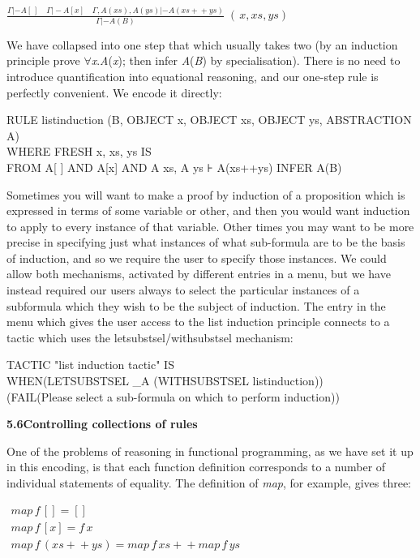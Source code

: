 $\frac{\Gamma  |- A[\,]\quad \Gamma  |- A[x]\quad \Gamma,A\left( xs\right),A\left( ys\right)  |- A\left( xs{}+{}+{}ys\right) }{\Gamma  |- A\left( B\right) } \;(\,x,xs,ys)$

We have collapsed into one step that which usually takes two (by an induction principle prove \ensuremath{\forall}\textit{x}.\textit{A}(\textit{x}); then infer \textit{A}(\textit{B}) by specialisation). There is no need to introduce quantification into equational reasoning, and our one-step rule is perfectly convenient. We encode it directly:

RULE listinduction (B, OBJECT x, OBJECT xs, OBJECT ys, ABSTRACTION A) \\
\tab WHERE FRESH x, xs, ys IS\\
\tab \tab FROM A[ ] AND A[x] AND A xs, A ys ⊦ A(xs++ys) INFER A(B)


Sometimes you will want to make a proof by induction of a proposition which is expressed in terms of some variable or other, and then you would want induction to apply to every instance of that variable. Other times you may want to be more precise in specifying just what instances of what sub-formula are to be the basis of induction, and so we require the user to specify those instances. We could allow both mechanisms, activated by different entries in a menu, but we have instead required our users always to select the particular instances of a subformula which they wish to be the subject of induction. The entry in the menu which gives the user access to the list induction principle connects to a tactic which uses the letsubstsel/withsubstsel mechanism:

TACTIC "list induction tactic" IS \\
\tab WHEN\tab (LETSUBSTSEL \_A (WITHSUBSTSEL listinduction))\\
\tab \tab (FAIL(Please select a sub-formula on which to perform induction))


\textbf{5.6\tab Controlling collections of rules}


One of the problems of reasoning in functional programming, as we have set it up in this encoding, is that each function definition corresponds to a number of individual statements of equality. The definition of \textit{map}, for example, gives three:


$ \begin{array}{l} map\,f\,[]=[] \\
map\,f\,[x]=f\,x \\
map\,f\,(xs{}+{}+{}ys)=map\,f\,xs{}+{}+{}map\,f\,ys \end{array} $

